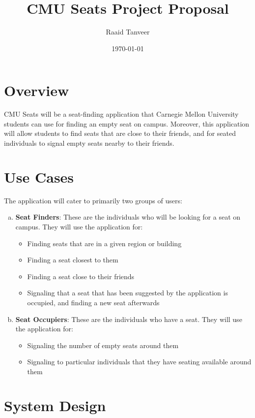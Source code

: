 \documentclass[11pt]{article}
\title{CMU Seats Project Proposal}
\author{Raaid Tanveer}
\date{\today}
\begin{document}
  \maketitle
  \section{Overview}
  CMU Seats will be a seat-finding application that Carnegie Mellon University students can use for finding an empty seat on campus. Moreover, this application will allow students to find seats that are close to their friends, and for seated individuals to signal empty seats nearby to their friends. 

  \section{Use Cases}
  The application will cater to primarily two groups of users:
  \begin{enumerate}[(a)]
    \item \textbf{Seat Finders}: These are the individuals who will be looking for a seat on campus. They will use the application for:
    \begin{itemize}
      \item Finding seats that are in a given region or building
      \item Finding a seat closest to them
      \item Finding a seat close to their friends
      \item Signaling that a seat that has been suggested by the application is occupied, and finding a new seat afterwards
    \end{itemize}
    \item \textbf{Seat Occupiers}: These are the individuals who have a seat. They will use the application for:
    \begin{itemize}
      \item Signaling the number of empty seats around them
      \item Signaling to particular individuals that they have seating available around them
    \end{itemize}
  \end{enumerate}
  \newpage
  \section{System Design}
\end{document}
